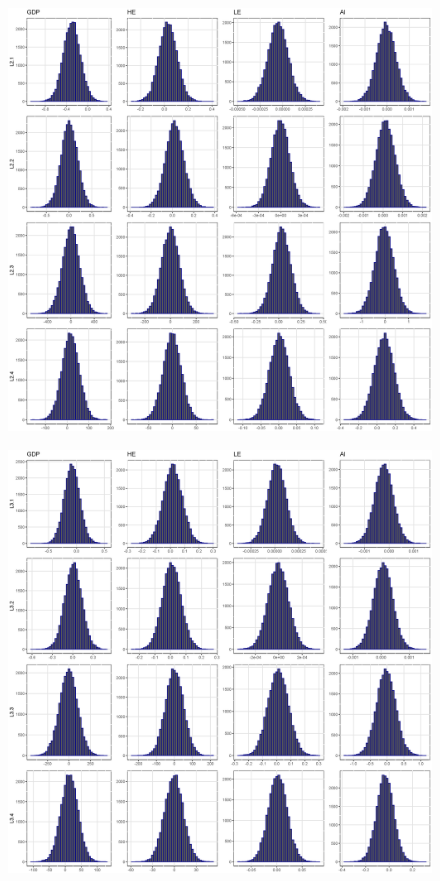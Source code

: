 \documentclass[11pt,preprint, authoryear]{elsarticle}
\let\origfigure\figure
\let\endorigfigure\endfigure
\renewenvironment{figure}[1][2] {
    \expandafter\origfigure\expandafter[H]
} {
    \endorigfigure
}
\numberwithin{equation}{section}
\numberwithin{figure}{section}
\numberwithin{table}{section}
\begin{document}
\begin{figure}
\begin{subfigure}[H]{0.49\textwidth}
         \includegraphics[width=\textwidth]{CoefLag2.eps}
     \end{subfigure}
    \begin{subfigure}[H]{0.49\textwidth}
         \centering
         \includegraphics[width=\textwidth]{CoefLag3.eps}
    \end{subfigure}
        \caption{Conditional normal Inverse-Wishart prior: Estimated BVAR(3) coefficients' posterior distributions using Gibbs sampling.}
        \label{posterior_iw}
\end{figure}


\end{document}
